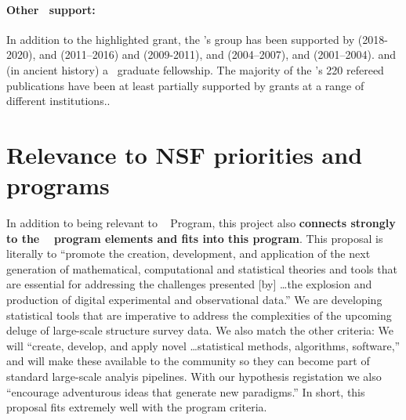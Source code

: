 \documentclass[12pt, fullpage, letterpaper]{article}
\begin{document}
\paragraph{Other \NSF\ support:}
In addition to the highlighted grant, the \PI's group has been supported by
 (2018-2020),
and
 (2011--2016)
and
 (2009-2011),
and
 (2004--2007),
and
 (2001--2004).
and (in ancient history) a \NSF\ graduate fellowship.
The majority of the \PI's 220 refereed publications have been at least partially supported
by \NSF grants at a range of different institutions..

\section{Relevance to NSF priorities and programs}

In addition to being relevant to \NSF\  Program, this
project also \textbf{connects strongly to the \NSF\ 
program elements and fits into this program}.
This proposal is literally to ``promote the creation,
development, and application of the next generation of mathematical,
computational and statistical theories and tools that are essential
for addressing the challenges presented [by] \ldots the explosion and production of digital
experimental and observational data.''
We are developing statistical tools that are imperative to address the complexities of the upcoming deluge of large-scale structure survey data.
We also match the other  criteria:
We will ``create, develop, and apply novel \ldots statistical methods, algorithms, software,'' and will make these available to the community so they can become part of standard large-scale analyis pipelines.
With our hypothesis registation we also ``encourage adventurous ideas that generate
new paradigms.'' In short, this proposal fits extremely well with the  program
criteria.
\end{document}
